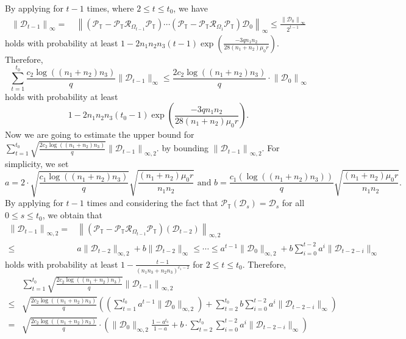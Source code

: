 \documentclass[twoside,12pt]{article}
\begin{document}
By applying  for $t-1$ times, where $2\leq t\leq t_{0}$, we  have 
\begin{align*}
 \left\|\mathcal{D}_{t-1}\right\|_{\infty} 
= & ~ \left\|\left(\mathcal{P}_{\mathbb{T}}-\mathcal{P}_{\mathbb{T}} \mathcal{R}_{\Omega_{t-1}} \mathcal{P}_{\mathbb{T}}\right) \cdots\left(\mathcal{P}_{\mathbb{T}}-\mathcal{P}_{\mathbb{T}} \mathcal{R}_{\Omega_1} \mathcal{P}_{\mathbb{T}}\right) \mathcal{D}_0\right\|_{\infty} \leq \frac{\left\|\mathcal{D}_0\right\|_{\infty} }{2^{t-1}}
\end{align*}
holds with probability  at least  $1-2n_{1}n_{2}n_{3}(t-1)\exp\left(\frac{-3qn_{1}n_{2}}{28(n_1+n_2)\mu_{0}r}\right)$.
Therefore, $$ \sum_{t=1}^{t_0}\frac{c_{2}\log((n_1+n_2)n_3)}{q}\|\mathcal{D}_{t-1}\|_{\infty}\leq \frac{2c_{2}\log((n_1+n_2)n_3)}{q}\cdot  \left\|\mathcal{D}_0\right\|_{\infty}$$
holds with probability at least 
\begin{equation}\label{eqn:probablity4boundinfty}
    1-2n_{1}n_{2}n_{3}(t_0-1)\exp\left(\frac{-3qn_{1}n_{2}}{28(n_1+n_2)\mu_{0}r}\right).
\end{equation}
Now we are going to estimate the upper bound for $\sum_{t=1}^{t_0}\sqrt{\frac{2c_{2}\log((n_1+n_2)n_3)}{q}}\left\|\mathcal{D}_{t-1}\right\|_{\infty,2}$. 
by bounding $\left\|\mathcal{D}_{t-1}\right\|_{\infty,2}$. For simplicity, we set
\[a = 2\cdot\sqrt{\frac{c_1\log((n_1+n_2)n_3)}{q}} \sqrt{\frac{(n_1+n_2)\mu_{0}r}{n_{1}n_{2}}}
\text{ and } b = \frac{c_{1}(\log((n_1+n_2)n_3))}{q} \sqrt{\frac{(n_1+n_2)\mu_{0}r}{n_{1}n_{2}}}.\]  
By applying  for $t-1$ times and considering the fact that $\mathcal{P}_{\mathbb{T}}(\mathcal{D}_{s})=\mathcal{D}_s$ for all $0\leq s\leq t_0$, we obtain that
\begin{align*}
  \left\|\mathcal{D}_{t-1}\right\|_{\infty, 2}  
=  & \left\|\left(\mathcal{P}_{\mathbb{T}}-\mathcal{P}_{\mathbb{T}} \mathcal{R}_{\Omega_{t-1}}\mathcal{P}_{\mathbb{T}}\right)\left(\mathcal{D}_{t-2}\right)\right\|_{\infty, 2}  \\
\leq&    a\|\mathcal{D}_{t-2}\|_{\infty,2}+b\|\mathcal{D}_{t-2}\|_{\infty}  
\leq   \cdots\leq a^{t-1}\|\mathcal{D}_0\|_{\infty,2} + b\sum\limits_{i=0}^{t-2}a^{i}\|\mathcal{D}_{t-2-i}\|_{\infty}
\end{align*}
holds with probability at least  $1-\frac{t-1}{(n_1n_3+n_2n_3)^{c_1-2}}$   for $2\leq t\leq t_0$. 
Therefore, 
\begin{align*}
&\sum_{t=1}^{t_0}\sqrt{\frac{2c_{2}\log((n_1+n_2)n_3)}{q}}\left\|\mathcal{D}_{t-1}\right\|_{\infty,2} \\
\leq&\sqrt{\frac{2c_{2}\log((n_1+n_2)n_3)}{q}}\left(\left(\sum_{t=1}^{t_0}a^{t-1}\|\mathcal{D}_0\|_{\infty,2} \right)+ \sum_{t=2}^{t_0} b\sum\limits_{i=0}^{t-2}a^{i}\|\mathcal{D}_{t-2-i}\|_{\infty}\right)  \\
    =& \sqrt{\frac{2c_{2}\log((n_1+n_2)n_3)}{q}} \cdot \left(\|\mathcal{D}_0\|_{\infty,2} \frac{1-a^{t_0}}{1-a}  +  b\cdot  \sum_{t=2}^{t_0}\sum_{i=0}^{t-2}a^i\|\mathcal{D}_{t-2-i}\|_{\infty}\right) \\
\end{align*}
\end{document}
